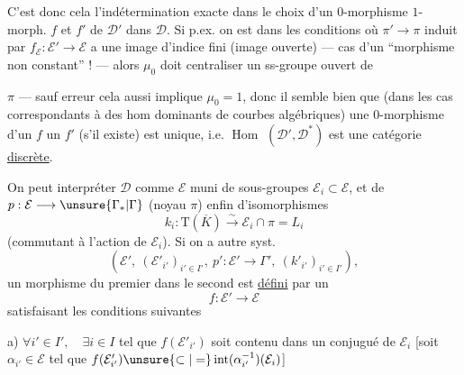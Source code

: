 C'est donc cela l'indétermination exacte dans le choix d'un $0$-morphisme  $1$-morph.  $f$ et $f'$ de $\mathcal D'$ dans $\mathcal D$.
Si p.ex. on est dans les conditions où
$\pi'\longrightarrow\pi$ induit par $f_{\mathcal E}:\mathcal E'\longrightarrow\mathcal E$  a une image d'indice fini (image ouverte)
--- cas d'un ``morphisme non constant'' ! ---
alors $\mu_0$ doit centraliser un ss-groupe ouvert de

$\pi$ --- sauf erreur cela aussi implique $\mu_0=1$, donc il semble bien que  (dans les cas correspondants à des hom dominants de courbes algébriques) une  $0$-morphisme d'un $f$  un $f'$ (s'il existe) est unique, i.e. \uline{$\operatorname{Hom}$} $(\mathcal D',\mathcal D^*)$ est une catégorie \uline{discrète}.

On peut interpréter $\mathcal D$ comme $\mathcal E$ muni de sous-groupes $\mathcal E_i\subset\mathcal E$, et de $p:\mathcal E\longrightarrow\unsure{\Gamma_*|\Gamma}$ (noyau $\pi$) enfin d'isomorphismes
\[
k_i:\mathrm T(\overline K)\xrightarrow{\sim}\mathcal E_i\cap\pi=L_i
\]
(commutant à l'action de $\mathcal E_i$).
Si on a  autre syst.
\[
(\mathcal E',\ (\mathcal E'_{i'})_{i'\in I'},\ p':\mathcal E'\longrightarrow\Gamma',\ (k'_{i'})_{i'\in I'}),
\]
un morphisme du premier dans le second est \uline{défini} par un
\[
f:\mathcal E'\longrightarrow\mathcal E
\]
satisfaisant les conditions suivantes


a) $\forall i'\in I',\quad\exists i\in I$ tel que $f(\mathcal E'_{i'})$ soit contenu dans un conjugué de $\mathcal E_i$
[soit $\alpha_{i'}\in\mathcal E$ tel que
$f(\mathcal E'_{i'})\unsure{\subset|=}\operatorname{int}(\alpha_{i'}^{-1})(\mathcal E_i)$]

